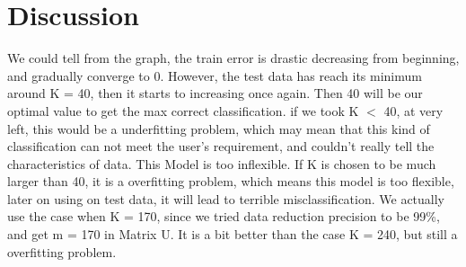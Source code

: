 \documentclass[a4paper]{article}
\begin{document}
\newpage
\section*{Discussion}
We could tell from the graph, the train error is drastic decreasing from beginning, and gradually converge to 0. However, the test data has reach its minimum around K = 40, then it starts to increasing once again. Then 40 will be our optimal value to get the max correct classification. if we took K $<$ 40, at very left, this would be a underfitting problem, which may mean that this kind of classification can not meet the user's requirement, and couldn't really tell the characteristics of data. This Model is too inflexible. If K is chosen to be much larger than 40, it is a overfitting problem, which means this model is too flexible, later on using on test data, it will lead to terrible misclassification. We actually use the case when K = 170, since we tried data reduction precision to be 99\%, and get m = 170 in Matrix U. It is a bit better than the case K = 240, but still a overfitting problem.
 
\end{document}
